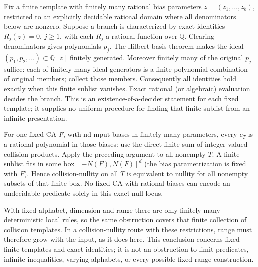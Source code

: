 \begin{remark}\label{rem:noether}
Fix a finite template with finitely many rational bias parameters $z=(z_1,\ldots,z_b)$, restricted to an explicitly decidable rational domain where all denominators below are nonzero. Suppose a branch is characterized by exact identities $R_j(z)=0$, $j\ge1$, with each $R_j$ a rational function over $\mathbb Q$. Clearing denominators gives polynomials $p_j$. The Hilbert basis theorem \cite[Section 2.5]{CLO} makes the ideal $(p_1,p_2,\ldots)\subset\mathbb Q[z]$ finitely generated. Moreover finitely many of the original $p_j$ suffice: each of finitely many ideal generators is a finite polynomial combination of original members; collect those members. Consequently all identities hold exactly when this finite sublist vanishes. Exact rational (or algebraic) evaluation decides the branch. This is an existence-of-a-decider statement for each fixed template; it supplies no uniform procedure for finding that finite sublist from an infinite presentation.

For one fixed CA $F$, with iid input biases in finitely many parameters, every $c_T$ is a rational polynomial in those biases: use the direct finite sum of integer-valued collision products. Apply the preceding argument to all nonempty $T$. A finite sublist fits in some box $[-N(F),N(F)]^d$ (the bias parametrization is fixed with $F$). Hence collision-nullity on all $T$ is equivalent to nullity for all nonempty subsets of that finite box. No fixed CA with rational biases can encode an undecidable predicate solely in this exact null locus.

With fixed alphabet, dimension and range there are only finitely many deterministic local rules, so the same obstruction covers that finite collection of collision templates. In a collision-nullity route with these restrictions, range must therefore grow with the input, as it does here. This conclusion concerns fixed finite templates and exact identities; it is not an obstruction to limit predicates, infinite inequalities, varying alphabets, or every possible fixed-range construction.
\end{remark}

